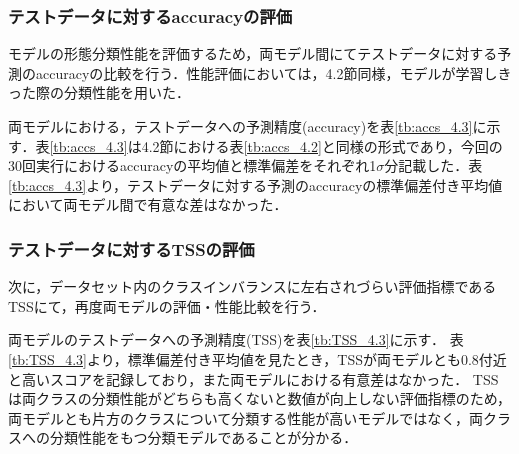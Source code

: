 \documentclass[a4j, 11pt]{jreport}
\begin{document}


\subsubsection{テストデータに対するaccuracyの評価}
モデルの形態分類性能を評価するため，両モデル間にてテストデータに対する予測のaccuracyの比較を行う．性能評価においては，4.2節同様，モデルが学習しきった際の分類性能を用いた．

両モデルにおける，テストデータへの予測精度(accuracy)を表\ref{tb:accs_4.3}に示す．表\ref{tb:accs_4.3}は4.2節における表\ref{tb:accs_4.2}と同様の形式であり，今回の30回実行におけるaccuracyの平均値と標準偏差をそれぞれ1$\sigma$分記載した．表\ref{tb:accs_4.3}より，テストデータに対する予測のaccuracyの標準偏差付き平均値において両モデル間で有意な差はなかった．

\subsubsection{テストデータに対するTSSの評価}
次に，データセット内のクラスインバランスに左右されづらい評価指標であるTSSにて，再度両モデルの評価・性能比較を行う．


両モデルのテストデータへの予測精度(TSS)を表\ref{tb:TSS_4.3}に示す．
表\ref{tb:TSS_4.3}より，標準偏差付き平均値を見たとき，TSSが両モデルとも0.8付近と高いスコアを記録しており，また両モデルにおける有意差はなかった．
TSSは両クラスの分類性能がどちらも高くないと数値が向上しない評価指標のため，
両モデルとも片方のクラスについて分類する性能が高いモデルではなく，両クラスへの分類性能をもつ分類モデルであることが分かる．
\end{document}
